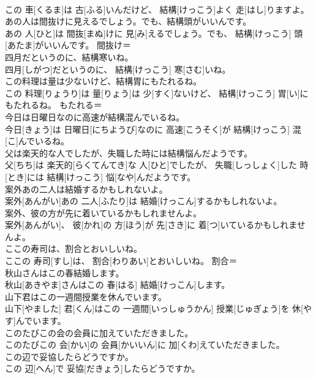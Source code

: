 \documentclass[8pt]{extreport}
\begin{document}
\begin{CJK}{UTF8}{min}
\\	この 車[くるま]は 古[ふる]いんだけど、 結構[けっこう]よく 走[はし]りますよ。	
\\	あの人は間抜けに見えるでしょう。でも、結構頭がいいんです。	
\\	あの 人[ひと]は 間抜[まぬ]けに 見[み]えるでしょう。でも、 結構[けっこう] 頭[あたま]がいいんです。	間抜け＝ 
\\	四月だというのに、結構寒いね。	
\\	四月[しがつ]だというのに、 結構[けっこう] 寒[さむ]いね。	
\\	この料理は量は少ないけど、結構胃にもたれるね。	
\\	この 料理[りょうり]は 量[りょう]は 少[すく]ないけど、 結構[けっこう] 胃[い]にもたれるね。	もたれる＝ 
\\	今日は日曜日なのに高速が結構混んでいるね。	
\\	今日[きょう]は 日曜日[にちようび]なのに 高速[こうそく]が 結構[けっこう] 混[こ]んでいるね。	
\\	父は楽天的な人でしたが、失職した時には結構悩んだようです。	
\\	父[ちち]は 楽天的[らくてんてき]な 人[ひと]でしたが、 失職[しっしょく]した 時[とき]には 結構[けっこう] 悩[なや]んだようです。	
\\	案外あの二人は結婚するかもしれないよ。	
\\	案外[あんがい]あの 二人[ふたり]は 結婚[けっこん]するかもしれないよ。	
\\	案外、彼の方が先に着いているかもしれませんよ。	
\\	案外[あんがい]、 彼[かれ]の 方[ほう]が 先[さき]に 着[つ]いているかもしれませんよ。	
\\	ここの寿司は、割合とおいしいね。	
\\	ここの 寿司[すし]は、 割合[わりあい]とおいしいね。	割合＝ 
\\	秋山さんはこの春結婚します。	
\\	秋山[あきやま]さんはこの 春[はる] 結婚[けっこん]します。	
\\	山下君はこの一週間授業を休んでいます。	
\\	山下[やました] 君[くん]はこの 一週間[いっしゅうかん] 授業[じゅぎょう]を 休[やす]んでいます。	
\\	このたびこの会の会員に加えていただきました。	
\\	このたびこの 会[かい]の 会員[かいいん]に 加[くわ]えていただきました。	
\\	この辺で妥協したらどうですか。	
\\	この 辺[へん]で 妥協[だきょう]したらどうですか。	

\end{CJK}
\end{document}
